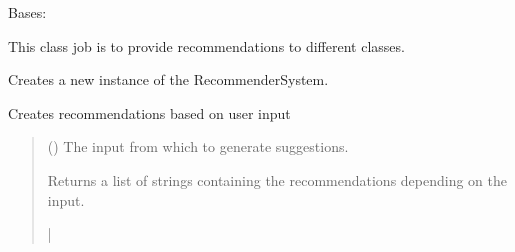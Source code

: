 \documentclass[letterpaper,10pt,english]{sphinxmanual}
\begin{document}
\begin{fulllineitems}
\label{\detokenize{apidoc/src.osm_configurator.model.application:src.osm_configurator.model.application.recommender_system.RecommenderSystem}}
\pysigstartsignatures
{}
\pysigstopsignatures
\sphinxAtStartPar
Bases: 

\sphinxAtStartPar
This class job is to provide recommendations to different classes.

\begin{fulllineitems}
\label{\detokenize{apidoc/src.osm_configurator.model.application:src.osm_configurator.model.application.recommender_system.RecommenderSystem.__init__}}
\pysigstartsignatures
{}
\pysigstopsignatures
\sphinxAtStartPar
Creates a new instance of the RecommenderSystem.

\end{fulllineitems}


\begin{fulllineitems}
\label{\detokenize{apidoc/src.osm_configurator.model.application:src.osm_configurator.model.application.recommender_system.RecommenderSystem.recommend}}
\pysigstartsignatures
{}
\pysigstopsignatures
\sphinxAtStartPar
Creates recommendations based on user input
\begin{quote}\begin{description}
\sphinxAtStartPar
{} () \textendash{} The input from which to generate suggestions.

\sphinxAtStartPar
Returns a list of strings containing the recommendations depending on the input.

\sphinxAtStartPar
{}|\sphinxhref{https://docs.python.org/3.11/library/stdtypes.html\#str}{str}{]}

\end{description}\end{quote}

\end{fulllineitems}


\end{fulllineitems}
\end{document}
